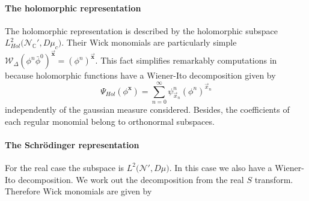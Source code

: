 \documentclass[12pt]{article}%
\begin{document}
\paragraph*{The holomorphic representation}
    The holomorphic representation is described by the holomorphic subspace $L^2_{Hol}\big({\mathcal{N}_{\mathbb{C}}'}, D\mu_c\big)$. Their Wick monomials are particularly simple $\mathcal{W}_\Delta(\phi^n\bar{\phi}^0)^{\vec{\mathbf{x}}}= (\phi^n)^{\vec{\mathbf{x}}}$. This fact simplifies remarkably computations in because holomorphic functions have a Wiener-Ito  decomposition given by 
    \begin{equation}
    \label{eq:holchaosdecomposition}
    \Psi_{Hol}(\phi^{\mathbf{x}})=\sum_{n=0}^\infty\psi^{n}_{\vec{x}_n}(\phi^n)^{\vec{x}_n}
    \end{equation}
     independently of the gaussian measure considered. Besides, the coefficients of each regular monomial belong to orthonormal subspaces. 

     \paragraph*{The Schrödinger representation}
    For the real case the subspace is $L^2\big({\mathcal{N}'}, D\mu\big)$. In this case we also have a Wiener-Ito decomposition.  We work out the decomposition from the real $S$ transform. Therefore Wick monomials are given by 
\end{document}
